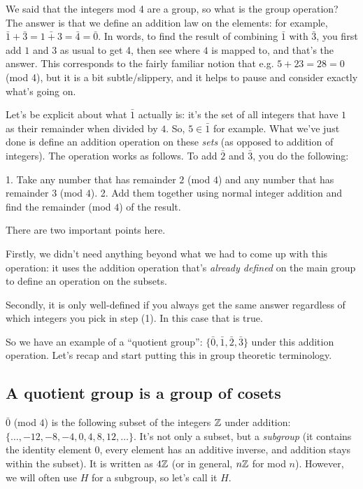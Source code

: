 We said that the integers mod 4 are a group, so what is the group operation?
The answer is that we define an addition law on the elements: for example,
$\bar 1 + \bar 3 = \bar{1 + 3} = \bar 4 = \bar 0$. In words, to find the result
of combining $\bar 1$ with $\bar 3$, you first add $1$ and $3$ as usual to get
4, then see where $4$ is mapped to, and that's the answer. This corresponds to
the fairly familiar notion that e.g. $5 + 23 = 28 = 0$ (mod 4), but it is a bit
subtle/slippery, and it helps to pause and consider exactly what's going on.

Let's be explicit about what $\bar 1$ actually is: it's the set of all integers
that have $1$ as their remainder when divided by $4$. So, $5 \in \bar 1$ for
example. What we've just done is define an addition operation on these
\emph{sets} (as opposed to addition of integers). The operation works as
follows. To add $\bar 2$ and $\bar 3$, you do the following:

1. Take any number that has remainder $2$ (mod $4$) and any number that has
   remainder $3$ (mod $4$).
2. Add them together using normal integer addition and find the remainder (mod
   $4$) of the result.

There are two important points here.

Firstly, we didn't need anything beyond what we had to come up with this
operation: it uses the addition operation that's \emph{already defined} on the
main group to define an operation on the subsets.

Secondly, it is only well-defined if you always get the same answer regardless
of which integers you pick in step (1). In this case that is true.

So we have an example of a ``quotient group'': $\{\bar 0, \bar 1, \bar 2, \bar
3\}$ under this addition operation. Let's recap and start putting this in group
theoretic terminology.


\subsection{A quotient group is a group of cosets}

$\bar 0$ (mod $4$) is the following subset of the integers $\mathbb{Z}$ under addition:
$\{\ldots, -12, -8, -4, 0, 4, 8, 12, \ldots\}$. It's not only a subset, but a
\emph{subgroup} (it contains the identity element $0$, every element has an
additive inverse, and addition stays within the subset). It is written as $4\mathbb{Z}$
(or in general, $n\mathbb{Z}$ for mod $n$). However, we will often use $H$ for a
subgroup, so let's call it $H$.

